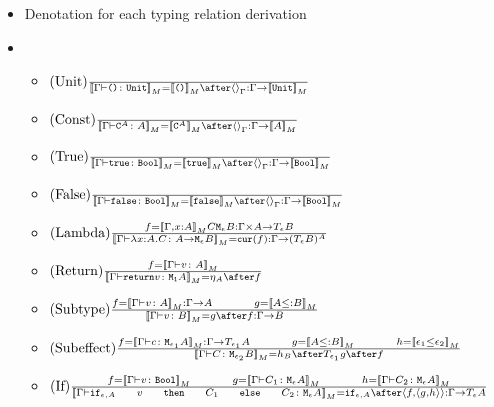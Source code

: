 \documentclass{report}
\begin{document}
\begin{itemize}
    \item Denotation for each typing relation derivation
    \item \begin{itemize}
        \item $\treerule{Unit}{}{\deno{\typerelation{\G}{\u}{\U}} = \deno{\u} \after \term{\G} : \G \rightarrow \deno{\U}}$
        
        \item $\treerule{Const}{}{\deno{\typerelation{\G}{\const{A}}{A}} = \deno{\const{A}} \after \term{\G} : \G \rightarrow \deno{A}}$
         
        \item $\treerule{True}{}{\deno{\typerelation{\G}{\t}{\B}} = \deno{\t} \after \term{\G} : \G \rightarrow \deno{\B}}$
        
        \item $\treerule{False}{}{\deno{\typerelation{\G}{\f}{\B}} = \deno{\f} \after \term{\G} : \G \rightarrow \deno{\B}}$
        
        \item $(\text{Lambda}) \frac{f = {\bf [\![}\Gamma, x: A{\bf ]\!]}_M{C}{\texttt{M}_{\epsilon}{B}} : \Gamma \times A \rightarrow T_{\epsilon}{B}}{{\bf [\![}\Gamma \vdash \lambda x : A. C \colon A \rightarrow \texttt{M}_{\epsilon}{B}{\bf ]\!]}_M = \texttt{cur}(f) : \Gamma \rightarrow (T_{\epsilon}{B})^A}$
        
        \item $\treerule{Return}{f = \deno{\typerelation{\G}{v}{A}}}{\deno{\typerelation{\G}{\return{v}}{\M{\1}{A}}} = \point{A} \after f}$
        
        \item $\treerule{Subtype}{f = \deno{\typerelation{\G}{v}{A}} : \G \rightarrow A\s\s g = \deno{A \subtype B}}{\deno{\typerelation{\G}{v}{B}} = g \after f : \G \rightarrow B}$
        \item $\treerule{Subeffect}{f = \deno{\typerelation{\G}{c}{\M{\e_1}{A}}}: \G \rightarrow \T{\e_1}{A} \s\s g = \deno{A \subtype B}\s\s h = \deno{\e_1 \subeffect{ \e_2}}}{\deno{\typerelation{\G}{C}{\M{\e_2}{B}}} = h_B \after \T{\e_1}{g} \after f}$
        
        \item $\treerule{If}{f = \deno{\typerelation{\G}{v}{\B}}\s\s g = \deno{\typerelation{\G}{C_1}{\mea}}\s\s h = \deno{\typerelation{\G}{C_2}{\mea}}}{\deno{{\typerelation{\G}{\ifthenelse{\e}{A}{v}{C_1}{C_2}}{\mea}}} = \ifd{\e}{A} \after \pr{f}{\pr{g}{h}} : \G \rightarrow \T{\e}{A}}$
        

\end{itemize}
\end{itemize}
\end{document}
